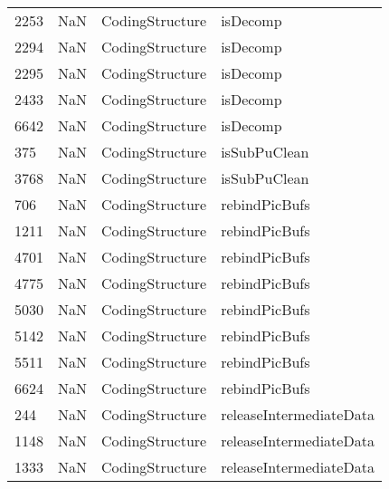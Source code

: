 \begin{tabular}{llll}
2253 &                   NaN &            CodingStructure &                                  isDecomp \\
2294 &                   NaN &            CodingStructure &                                  isDecomp \\
2295 &                   NaN &            CodingStructure &                                  isDecomp \\
2433 &                   NaN &            CodingStructure &                                  isDecomp \\
6642 &                   NaN &            CodingStructure &                                  isDecomp \\
375  &                   NaN &            CodingStructure &                              isSubPuClean \\
3768 &                   NaN &            CodingStructure &                              isSubPuClean \\
706  &                   NaN &            CodingStructure &                             rebindPicBufs \\
1211 &                   NaN &            CodingStructure &                             rebindPicBufs \\
4701 &                   NaN &            CodingStructure &                             rebindPicBufs \\
4775 &                   NaN &            CodingStructure &                             rebindPicBufs \\
5030 &                   NaN &            CodingStructure &                             rebindPicBufs \\
5142 &                   NaN &            CodingStructure &                             rebindPicBufs \\
5511 &                   NaN &            CodingStructure &                             rebindPicBufs \\
6624 &                   NaN &            CodingStructure &                             rebindPicBufs \\
244  &                   NaN &            CodingStructure &                   releaseIntermediateData \\
1148 &                   NaN &            CodingStructure &                   releaseIntermediateData \\
1333 &                   NaN &            CodingStructure &                   releaseIntermediateData \\

\end{tabular}
